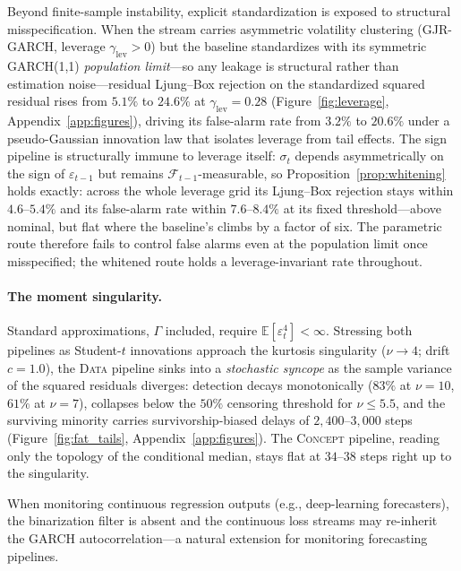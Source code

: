 \documentclass[sigconf,anonymous,review]{acmart}
\theoremstyle{acmdefinition}
\begin{document}
Beyond finite-sample instability, explicit standardization is exposed to structural misspecification. When the stream carries asymmetric volatility clustering (GJR-GARCH, leverage $\gamma_{\mathrm{lev}} > 0$) but the baseline standardizes with its symmetric GARCH(1,1) \emph{population limit}---so any leakage is structural rather than estimation noise---residual Ljung--Box rejection on the standardized squared residual rises from $5.1\%$ to $24.6\%$ at $\gamma_{\mathrm{lev}} = 0.28$ (Figure~\ref{fig:leverage}, Appendix~\ref{app:figures}), driving its false-alarm rate from $3.2\%$ to $20.6\%$ under a pseudo-Gaussian innovation law that isolates leverage from tail effects. The sign pipeline is structurally immune to leverage itself: $\sigma_t$ depends asymmetrically on the sign of $\varepsilon_{t-1}$ but remains $\mathcal{F}_{t-1}$-measurable, so Proposition~\ref{prop:whitening} holds exactly: across the whole leverage grid its Ljung--Box rejection stays within $4.6$--$5.4\%$ and its false-alarm rate within $7.6$--$8.4\%$ at its fixed threshold---above nominal, but flat where the baseline's climbs by a factor of six. The parametric route therefore fails to control false alarms even at the population limit once misspecified; the whitened route holds a leverage-invariant rate throughout.

\paragraph{The moment singularity.}\label{sec:singularity}

Standard approximations, $\Gamma$ included, require $\mathbb{E}[\varepsilon_t^4] < \infty$. Stressing both pipelines as Student-$t$ innovations approach the kurtosis singularity ($\nu \to 4$; drift $c = 1.0$), the \textsc{Data} pipeline sinks into a \emph{stochastic syncope} as the sample variance of the squared residuals diverges: detection decays monotonically ($83\%$ at $\nu = 10$, $61\%$ at $\nu = 7$), collapses below the $50\%$ censoring threshold for $\nu \le 5.5$, and the surviving minority carries survivorship-biased delays of $2{,}400$--$3{,}000$ steps (Figure~\ref{fig:fat_tails}, Appendix~\ref{app:figures}). The \textsc{Concept} pipeline, reading only the topology of the conditional median, stays flat at $34$--$38$ steps right up to the singularity.

When monitoring continuous regression outputs (e.g., deep-learning forecasters), the binarization filter is absent and the continuous loss streams may re-inherit the GARCH autocorrelation---a natural extension for monitoring forecasting pipelines.
\end{document}
